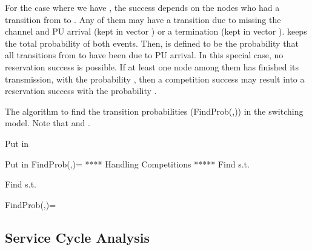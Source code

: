 \documentclass[12pt,journal,oneside,onecolumn]{IEEEtran}
\begin{document}
For the case where we have , the success depends on
the nodes who had a transition from  to .
Any of them may have a transition due to missing the channel and PU arrival (kept in vector ) 
or a termination (kept in vector ). 
 keeps the total probability of both events. Then,   
is defined to be the probability that all transitions from  
to  have been due to PU arrival. In this special case, 
no reservation success is possible. If at least one node among 
them has finished its transmission, with the probability , 
then a competition success may result into a reservation success with the probability .

\begin{algorithm}
\caption{\scriptsize{The algorithm to find the transition probabilities (FindProb(,)) in the switching model. Note that  and .}
\label{alg-queue-occ-switching}}
\tiny
\begin{algorithmic}
\IF { \& }
\STATE 
\ENDIF
\FOR{}
\IF {}
    \STATE 
\ELSE
    \IF {}
\IF {}
    					\STATE 
					 \ELSE
					 			\IF {}
    								\STATE 
    						\ELSE
             			  \STATE Put  in 
             			  \STATE 
    								\STATE 
    								\STATE 
    								\STATE 
    								\STATE 
    						\ENDIF
					 					
    			 \ENDIF
\ELSE
    			 \STATE Put  in 
    			 \STATE 
    \ENDIF
\ENDIF
\ENDFOR
\FOR{}
 \STATE 
\ENDFOR
 \STATE 
\STATE FindProb(,)=
\STATE ***** Handling Competitions ***** 
\IF {}
		\STATE Find  s.t.  
	  \IF {}
    	  \STATE 
    \ELSE
				\IF {}
							\STATE 
				\ENDIF
				
    \ENDIF

\ELSE
		\STATE Find  s.t.  
	  \IF {}
    	  \STATE 
    	  \STATE 
    \ELSE
				\IF {}
							\STATE 
				\ENDIF
				
    \ENDIF
\ENDIF

\STATE FindProb(,)=
\end{algorithmic}
\end{algorithm}
\normalsize


\subsection{Service Cycle Analysis}
\label{sec:switching_service_cycle}
\end{document}
